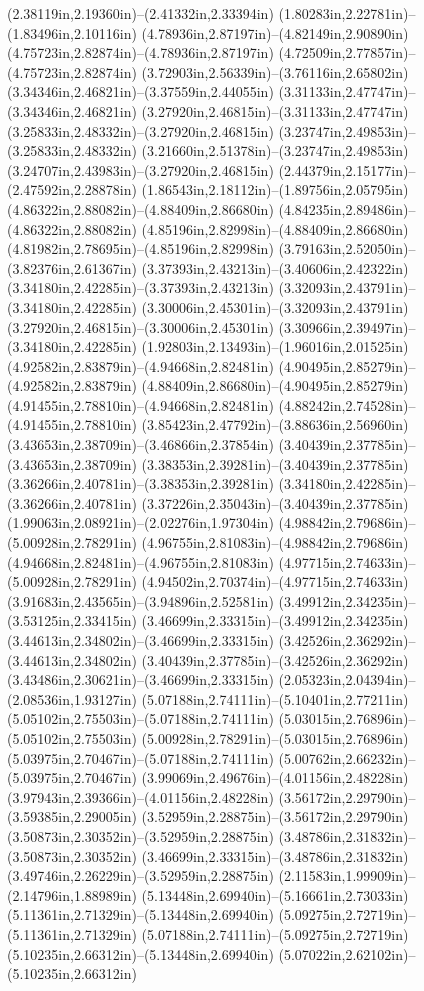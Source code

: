 (2.38119in,2.19360in)--(2.41332in,2.33394in) (1.80283in,2.22781in)--(1.83496in,2.10116in) (4.78936in,2.87197in)--(4.82149in,2.90890in) (4.75723in,2.82874in)--(4.78936in,2.87197in) (4.72509in,2.77857in)--(4.75723in,2.82874in) (3.72903in,2.56339in)--(3.76116in,2.65802in) (3.34346in,2.46821in)--(3.37559in,2.44055in) (3.31133in,2.47747in)--(3.34346in,2.46821in) (3.27920in,2.46815in)--(3.31133in,2.47747in) (3.25833in,2.48332in)--(3.27920in,2.46815in) (3.23747in,2.49853in)--(3.25833in,2.48332in) (3.21660in,2.51378in)--(3.23747in,2.49853in) (3.24707in,2.43983in)--(3.27920in,2.46815in) (2.44379in,2.15177in)--(2.47592in,2.28878in) (1.86543in,2.18112in)--(1.89756in,2.05795in) (4.86322in,2.88082in)--(4.88409in,2.86680in) (4.84235in,2.89486in)--(4.86322in,2.88082in) (4.85196in,2.82998in)--(4.88409in,2.86680in) (4.81982in,2.78695in)--(4.85196in,2.82998in) (3.79163in,2.52050in)--(3.82376in,2.61367in) (3.37393in,2.43213in)--(3.40606in,2.42322in) (3.34180in,2.42285in)--(3.37393in,2.43213in) (3.32093in,2.43791in)--(3.34180in,2.42285in) (3.30006in,2.45301in)--(3.32093in,2.43791in) (3.27920in,2.46815in)--(3.30006in,2.45301in) (3.30966in,2.39497in)--(3.34180in,2.42285in) (1.92803in,2.13493in)--(1.96016in,2.01525in) (4.92582in,2.83879in)--(4.94668in,2.82481in) (4.90495in,2.85279in)--(4.92582in,2.83879in) (4.88409in,2.86680in)--(4.90495in,2.85279in) (4.91455in,2.78810in)--(4.94668in,2.82481in) (4.88242in,2.74528in)--(4.91455in,2.78810in) (3.85423in,2.47792in)--(3.88636in,2.56960in) (3.43653in,2.38709in)--(3.46866in,2.37854in) (3.40439in,2.37785in)--(3.43653in,2.38709in) (3.38353in,2.39281in)--(3.40439in,2.37785in) (3.36266in,2.40781in)--(3.38353in,2.39281in) (3.34180in,2.42285in)--(3.36266in,2.40781in) (3.37226in,2.35043in)--(3.40439in,2.37785in) (1.99063in,2.08921in)--(2.02276in,1.97304in) (4.98842in,2.79686in)--(5.00928in,2.78291in) (4.96755in,2.81083in)--(4.98842in,2.79686in) (4.94668in,2.82481in)--(4.96755in,2.81083in) (4.97715in,2.74633in)--(5.00928in,2.78291in) (4.94502in,2.70374in)--(4.97715in,2.74633in) (3.91683in,2.43565in)--(3.94896in,2.52581in) (3.49912in,2.34235in)--(3.53125in,2.33415in) (3.46699in,2.33315in)--(3.49912in,2.34235in) (3.44613in,2.34802in)--(3.46699in,2.33315in) (3.42526in,2.36292in)--(3.44613in,2.34802in) (3.40439in,2.37785in)--(3.42526in,2.36292in) (3.43486in,2.30621in)--(3.46699in,2.33315in) (2.05323in,2.04394in)--(2.08536in,1.93127in) (5.07188in,2.74111in)--(5.10401in,2.77211in) (5.05102in,2.75503in)--(5.07188in,2.74111in) (5.03015in,2.76896in)--(5.05102in,2.75503in) (5.00928in,2.78291in)--(5.03015in,2.76896in) (5.03975in,2.70467in)--(5.07188in,2.74111in) (5.00762in,2.66232in)--(5.03975in,2.70467in) (3.99069in,2.49676in)--(4.01156in,2.48228in) (3.97943in,2.39366in)--(4.01156in,2.48228in) (3.56172in,2.29790in)--(3.59385in,2.29005in) (3.52959in,2.28875in)--(3.56172in,2.29790in) (3.50873in,2.30352in)--(3.52959in,2.28875in) (3.48786in,2.31832in)--(3.50873in,2.30352in) (3.46699in,2.33315in)--(3.48786in,2.31832in) (3.49746in,2.26229in)--(3.52959in,2.28875in) (2.11583in,1.99909in)--(2.14796in,1.88989in) (5.13448in,2.69940in)--(5.16661in,2.73033in) (5.11361in,2.71329in)--(5.13448in,2.69940in) (5.09275in,2.72719in)--(5.11361in,2.71329in) (5.07188in,2.74111in)--(5.09275in,2.72719in) (5.10235in,2.66312in)--(5.13448in,2.69940in) (5.07022in,2.62102in)--(5.10235in,2.66312in) 